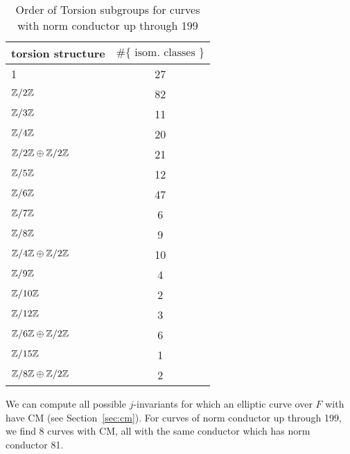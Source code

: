 \documentclass{amsart}
\begin{document}
\begin{center}
\begin{table}[h]
\caption{Order of Torsion subgroups for curves with norm conductor up through 199\label{table:counts}}
\begin{tabular}{|l|c|}\hline
torsion structure    & $\#\{\text{ isom. classes }\}$ \\\hline
1                    & 27 \\\hline
$\mathbb{Z}/2\mathbb{Z}$             & 82 \\\hline
$\mathbb{Z}/3\mathbb{Z}$             & 11 \\\hline
$\mathbb{Z}/4\mathbb{Z}$             & 20 \\\hline
$\mathbb{Z}/2\mathbb{Z}\oplus\mathbb{Z}/2\mathbb{Z}$ & 21 \\\hline
$\mathbb{Z}/5\mathbb{Z}$             & 12 \\\hline
$\mathbb{Z}/6\mathbb{Z}$             & 47 \\\hline
$\mathbb{Z}/7\mathbb{Z}$             & 6  \\\hline
$\mathbb{Z}/8\mathbb{Z}$             & 9  \\\hline
$\mathbb{Z}/4\mathbb{Z}\oplus\mathbb{Z}/2\mathbb{Z}$ & 10 \\\hline
$\mathbb{Z}/9\mathbb{Z}$             & 4  \\\hline
$\mathbb{Z}/10\mathbb{Z}$            & 2  \\\hline
$\mathbb{Z}/12\mathbb{Z}$            & 3  \\\hline
$\mathbb{Z}/6\mathbb{Z}\oplus\mathbb{Z}/2\mathbb{Z}$ & 6  \\\hline
$\mathbb{Z}/15\mathbb{Z}$            & 1  \\\hline
$\mathbb{Z}/8\mathbb{Z}\oplus\mathbb{Z}/2\mathbb{Z}$ & 2  \\\hline
\end{tabular}
\end{table}
\end{center}




We can compute all possible $j$-invariants for which an elliptic curve
over $F$ with have CM (see Section~\ref{sec:cm}).  For curves of norm
conductor up through 199, we find 8 curves with CM, all with the same
conductor which has norm conductor 81.
\end{document}
